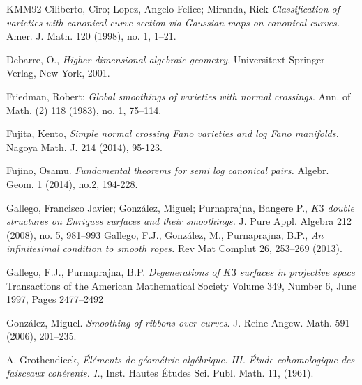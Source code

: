 \documentclass[11pt,twoside]{amsart}
\theoremstyle{plain}
\numberwithin{equation}{section}
\theoremstyle{definition}
\begin{document}
\begin{thebibliography}{KMM92}
Ciliberto, Ciro; Lopez, Angelo Felice; Miranda, Rick
\emph{Classification of varieties with canonical curve section via Gaussian maps on canonical curves.}
Amer. J. Math.   120 (1998), no. 1, 1–21.



\color{black}
 Debarre, O., \emph{Higher-dimensional algebraic geometry}, 
Universitext Springer--Verlag, New York, 2001.
\color{black}














Friedman, Robert; 
\emph{Global smoothings of varieties with normal crossings.} 
Ann. of Math. (2) 118 (1983), no. 1, 75--114.

 

\color{black}

 Fujita, Kento, \emph{Simple normal crossing Fano varieties and log Fano manifolds.}
Nagoya Math. J. 214 (2014), 95-123.

 Fujino, Osamu.
\emph{Fundamental theorems for semi log canonical pairs.} Algebr. Geom. 1 (2014), no.2, 194-228.

\color{black}

Gallego, Francisco Javier; González, Miguel; Purnaprajna, Bangere P., 
\emph{$K3$ double structures on Enriques surfaces and their smoothings.}
J. Pure Appl. Algebra 212 (2008), no. 5, 981--993
Gallego, F.J., González, M., Purnaprajna, B.P., 
\emph{An infinitesimal condition to smooth ropes.}
Rev Mat Complut 26, 253–269 (2013).



Gallego, F.J., Purnaprajna, B.P.
\emph{Degenerations of $K3$ surfaces in projective space}
Transactions of the American Mathematical Society
Volume 349, Number 6, June 1997, Pages 2477–2492

  Gonz\'alez, Miguel.
  \emph{Smoothing of ribbons over curves}.
  J. Reine Angew. Math. 591 (2006), 201--235.

  \color{black}

   A. Grothendieck, \emph{\'El\'ements 
de g\'eom\'etrie 
alg\'ebrique. III. \'Etude cohomologique des faisceaux 
coh\'erents. I.}, Inst. 
Hautes \'Etudes Sci. Publ. Math.  
{11}, (1961).


\end{thebibliography}
\end{document}
